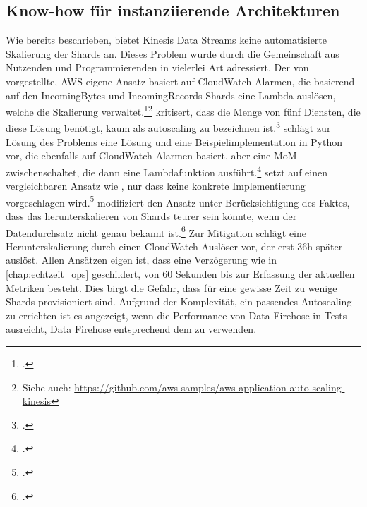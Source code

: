 \subsection{Know-how für instanziierende Architekturen}
Wie bereits beschrieben, bietet Kinesis Data Streams keine automatisierte Skalierung der Shards an. Dieses Problem wurde durch die Gemeinschaft aus Nutzenden und Programmierenden in vielerlei Art adressiert. Der von \citeauthor{AmazonWebServices.2018} vorgestellte, \ac{AWS} eigene Ansatz basiert auf CloudWatch Alarmen, die basierend auf den IncomingBytes und IncomingRecords Shards eine Lambda auslösen, welche die Skalierung verwaltet.\footcite[Vgl.][]{AmazonWebServices.2018}\nzitat\footnote{Siehe auch: \url{https://github.com/aws-samples/aws-application-auto-scaling-kinesis}} \citeauthor{Pogosova.28.05.2020} kritisert, dass die Menge von fünf Diensten, die diese Lösung benötigt, kaum als autoscaling zu bezeichnen ist.\footcite[Vgl.][]{Pogosova.28.05.2020} \citeauthor{Stanley.2019} schlägt zur Lösung des Problems eine Lösung und eine Beispielimplementation in Python vor, die ebenfalls auf CloudWatch Alarmen basiert, aber eine \ac{MoM} zwischenschaltet, die dann eine Lambdafunktion ausführt.\footcite[Vgl.][]{Stanley.2019} \citeauthor{Prasath.2019} setzt auf einen vergleichbaren Ansatz wie \citeauthor{Stanley.2019}, nur dass keine konkrete Implementierung vorgeschlagen wird.\footcite[Vgl.][]{Prasath.2019} \citeauthor{Cui.2017} modifiziert den Ansatz unter Berücksichtigung des Faktes, dass das herunterskalieren von Shards teurer sein könnte, wenn der Datendurchsatz nicht genau bekannt ist.\footcite[Vgl. auch im Folgendn][]{Cui.2017} Zur Mitigation schlägt \citeauthor{Cui.2017} eine Herunterskalierung durch einen CloudWatch Auslöser vor, der erst 36h später auslöst. Allen Ansätzen eigen ist, dass eine Verzögerung wie in \autoref{chap:echtzeit_ops} geschildert, von 60 Sekunden bis zur Erfassung der aktuellen Metriken besteht. Dies birgt die Gefahr, dass für eine gewisse Zeit zu wenige Shards provisioniert sind. Aufgrund der Komplexität, ein passendes Autoscaling zu errichten ist es angezeigt, wenn die Performance von Data Firehose in Tests ausreicht, Data Firehose entsprechend dem  zu verwenden.


